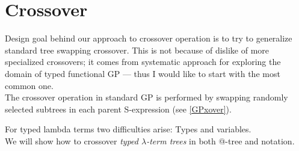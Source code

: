 \documentclass[12pt,a4paper]{report}
\makeatletter
\newcommand{\lterm}{$\lambda$-term\xspace}
\newcommand{\atTree}{@-tree\xspace}
\newenvironment{todo}
{ ~\\[0.5em]
  {\color{red}\textbf{TODO}}
  \begin{easylist}[itemize]}
{ \end{easylist}
  ~}
\makeatother
\begin{document}
%





\newpage
\section{Crossover}

Design goal behind our approach to crossover operation is
to try to generalize standard tree swapping crossover.
This is not because of dislike of more specialized crossovers;
it comes from systematic approach for exploring the domain of
typed functional GP --- thus I would like to start with the most common one.\\


The crossover operation in standard GP is performed 
by swapping randomly selected subtrees in each parent 
S-expression (see \ref{GPxover}).

For typed lambda terms two difficulties arise: Types and variables.\\

We will show how to crossover \textit{typed \lterm trees} in both 
\atTree and \sexprTree notation.\\
\end{document}
